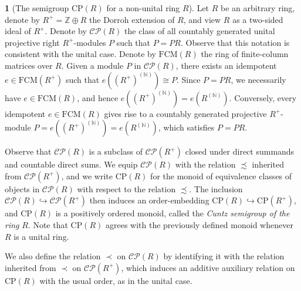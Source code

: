 \documentclass[11pt]{amsart}
\numberwithin{equation}{section}
\theoremstyle{definition}
\newtheorem{pgr}[pgrCt]{}
\theoremstyle{plain}
\theoremstyle{definition}
\begin{document}
\begin{pgr}[The semigroup $\mathrm{CP}(R)$ for a non-unital ring $R$] \label{def cp(r) no unital} Let $R$ be an arbitrary ring, denote by $R^{+}=\mathbb{Z}\oplus R$ the Dorroh extension of $R$, and view $R$ as a two-sided ideal of $R^+$. Denote by $\mathcal{CP}(R)$ the class of all countably generated unital projective right $R^{+}$-modules $P$ such that $P=PR$. Observe that this notation is consistent with the unital case. %
Denote by $\mathrm{FCM}(R)$ the ring of finite-column matrices over $R$. Given a module $P$ in $\mathcal{CP}(R)$, there exists an idempotent $e \in \mathrm{FCM}(R^+)$ such that $e((R^+)^{(\mathbb N)}) \cong P$.
Since $P = PR$, we necessarily have $e \in \mathrm{FCM}(R)$, and hence $e((R^+)^{(\mathbb N)}) = e(R^{(\mathbb N)})$. Conversely, every idempotent $e \in \mathrm{FCM}(R)$ gives rise to a countably generated projective $R^+$-module $P = e((R^+)^{(\mathbb N)}) = e(R^{(\mathbb N)})$, which satisfies $P = PR$. 



Observe that $\mathcal{CP}(R)$ is a subclass of $\mathcal{CP}(R^{+})$ closed under direct summands and countable direct sums. We equip $\mathcal{CP}(R)$ with the relation $\precsim$ inherited from $\mathcal{CP}(R^{+})$, and we write $\mathrm{CP}(R)$ for the monoid of equivalence classes of objects in $\mathcal{CP}(R)$ with respect to the relation $\precsim$. The inclusion $\mathcal{CP}(R) \hookrightarrow \mathcal{CP}(R^+)$ then induces an order-embedding $\mathrm{CP}(R) \hookrightarrow \mathrm{CP}(R^+)$, and $\mathrm{CP}(R)$ is a positively ordered monoid, called the \emph{Cuntz semigroup of the ring} $R$. Note that $\mathrm{CP}(R)$ agrees with the previously defined monoid whenever $R$ is a unital ring. 

We also define the relation $\prec$ on $\mathcal{CP}(R)$ by identifying it with the relation inherited from $\prec$ on $\mathcal{CP}(R^+)$, which induces an additive auxiliary relation on $\mathrm{CP}(R)$ with the usual order, as in the unital case. 
\end{pgr}
\end{document}
